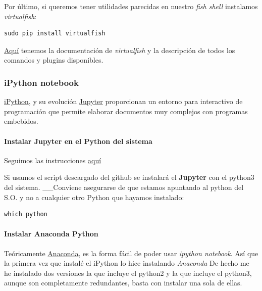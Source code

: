 \documentclass[12pt,spanish,]{scrartcl}
\let\oldparagraph\paragraph
\renewcommand{\paragraph}[1]{\oldparagraph{#1}\mbox{}}
\begin{document}
Por último, si queremos tener utilidades parecidas en nuestro \emph{fish
shell} instalamos \emph{virtualfish}:

\begin{verbatim}
sudo pip install virtualfish
\end{verbatim}

\href{http://virtualfish.readthedocs.io/en/latest/index.html}{Aquí}
tenemos la documentación de \emph{virtualfish} y la descripción de todos
los comandos y plugins disponibles.

\subsubsection{iPython notebook}\label{ipython-notebook}

\href{https://ipython.org/}{iPython}, y su evolución
\href{https://jupyter.org/index.html}{Jupyter} proporcionan un entorno
para interactivo de programación que permite elaborar documentos muy
complejos con programas embebidos.

\paragraph{Instalar Jupyter en el Python del
sistema}\label{instalar-jupyter-en-el-python-del-sistema}

Seguimos las instrucciones
\href{https://gist.github.com/frgomes/24c1923f2c9f14a27b14}{aquí}

Si usamos el script descargado del github se instalará el
\textbf{Jupyter} con el python3 del sistema. \_\_Conviene asegurarse de
que estamos apuntando al python del S.O. y no a cualquier otro Python
que hayamos instalado:

\begin{verbatim}
which python
\end{verbatim}

\paragraph{Instalar Anaconda Python}\label{instalar-anaconda-python}

Teóricamente \href{https://www.continuum.io/downloads}{Anaconda}, es la
forma fácil de poder usar \emph{ipython notebook}. Así que la primera
vez que instalé el iPython lo hice instalando \emph{Anaconda} De hecho
me he instalado dos versiones la que incluye el python2 y la que incluye
el python3, aunque son completamente redundantes, basta con instalar una
sola de ellas.
\end{document}
